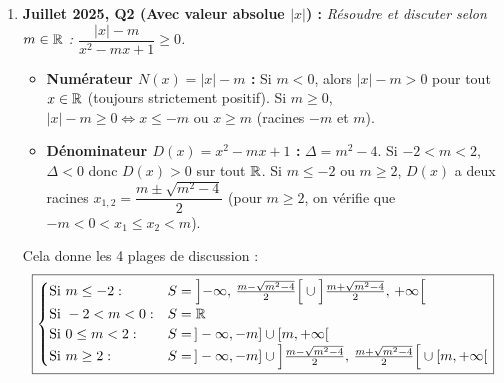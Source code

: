 \begin{exemple}
\begin{enumerate}
    \item \textbf{Juillet 2025, Q2 (Avec valeur absolue $|x|$) :} \emph{Résoudre et discuter selon $m \in \mathbb{R}$ : $\dfrac{|x| - m}{x^2 - mx + 1} \ge 0$.}\\
    \begin{itemize}
        \item \textbf{Numérateur $N(x) = |x| - m$ :} Si $m < 0$, alors $|x| - m > 0$ pour tout $x \in \mathbb{R}$ (toujours strictement positif). Si $m \ge 0$, $|x| - m \ge 0 \iff x \le -m \text{ ou } x \ge m$ (racines $-m$ et $m$).
        \item \textbf{Dénominateur $D(x) = x^2 - mx + 1$ :} $\Delta = m^2 - 4$.
        Si $-2 < m < 2$, $\Delta < 0$ donc $D(x) > 0$ sur tout $\mathbb{R}$. Si $m \le -2$ ou $m \ge 2$, $D(x)$ a deux racines $x_{1,2} = \dfrac{m \pm \sqrt{m^2 - 4}}{2}$ (pour $m \ge 2$, on vérifie que $-m < 0 < x_1 \le x_2 < m$).
    \end{itemize}
    Cela donne les 4 plages de discussion :
    \[
        \boxed{\begin{cases}
            \text{Si } m \le -2 : & S = \left]-\infty,\, \frac{m - \sqrt{m^2-4}}{2}\right[ \cup \left]\frac{m + \sqrt{m^2-4}}{2},\, +\infty\right[ \\
            \text{Si } -2 < m < 0 : & S = \mathbb{R} \\
            \text{Si } 0 \le m < 2 : & S = \,]-\infty, -m] \cup [m, +\infty[ \\
            \text{Si } m \ge 2 : & S = \,]-\infty, -m] \cup \left]\frac{m - \sqrt{m^2-4}}{2},\, \frac{m + \sqrt{m^2-4}}{2}\right[ \cup [m, +\infty[
        \end{cases}}
    \]


\end{enumerate}
\end{exemple}
